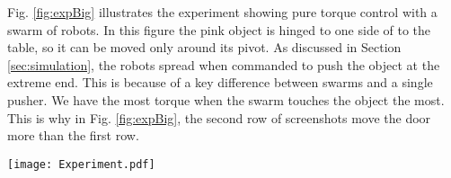 Fig. \ref{fig:expBig} illustrates the experiment showing pure torque control with a swarm of robots. In this figure the pink object is hinged to one side of to the table, so it can be moved only around its pivot. As discussed in Section \ref{sec:simulation}, the robots spread when commanded to push the object at the extreme end. This is because of a key difference between swarms and a single pusher. We have the most torque when the swarm touches the object the most. This is why in Fig. \ref{fig:expBig}, the second row of screenshots move the door more than the first row.
\begin{figure*}
\centering

\texttt{[image: Experiment.pdf]}
\vspace{-1em}
\caption{\label{fig:expBig}{Snapshots showing the effect of length of $L$ when we are controlling torque, with 97 robots. The above snapshots illustrates that the swarm will spread out and will not have enough force when $L$ is big. Below show that when the swarm pushes from the middle, mean will not pass the object frequently and it would make enough force. See video attachment. }
}
\end{figure*}






